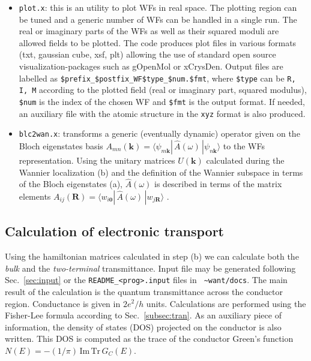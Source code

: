 \begin{itemize}
\item {\tt plot.x}: this is an utility to plot WFs in real space.
      The plotting region can be tuned and a generic number of WFs can be
      handled in a single run.
      The real or imaginary parts of the WFs as well as their squared moduli are
      allowed fields to be plotted.
      The code produces plot files in various formats (txt, gaussian cube, xsf, plt)
      allowing the use of standard open source visualization-packages
      such as gOpenMol or xCrysDen. Output files are labelled as
      {\tt \$prefix\_\$postfix\_WF\$type\_\$num.\$fmt}, where {\tt \$type} can be
      {\tt R, I, M} according to the plotted field (real or imaginary part, squared
      modulus), {\tt \$num} is the index of the chosen WF and {\tt \$fmt} is the
      output format. If needed, an auxiliary file with the atomic structure
      in the {\tt xyz} format is also produced.
\item {\tt blc2wan.x}: transforms a generic (eventually dynamic) operator
      given on the Bloch eigenstates basis $A_{mn}(\mathbf{k}) =
      \langle \psi_{m\mathbf{k}} |\, \widehat{A}(\omega) \,|
      \psi_{n\mathbf{k}} \rangle$ to the WFs representation.
      Using the unitary matrices $U(\mathbf{k})$ calculated during the Wannier localization
      (b) and the definition of the Wannier subspace in terms of the Bloch eigenstates
      (a), $\widehat{A}(\omega)$ is described in terms of the matrix elements
      $A_{ij}(\mathbf{R}) = \langle w_{i\mathbf{0}} |\, \widehat{A}(\omega) \,|
      w_{j\mathbf{R}} \rangle$ .
\end{itemize}


\subsection {Calculation of electronic transport}
\label{subsection:transport}

Using the hamiltonian matrices calculated in step (b) we can
calculate both the {\em bulk} and the {\em two-terminal}
transmittance. Input file may be generated following
Sec.~\ref{sec:input} or the {\tt README\_<prog>.input} files in {\tt
\~{}want/docs}. The main result of the calculation is the quantum
transmittance across the conductor region.
Conductance is given in $2e^2/h$ units.
Calculations are performed using the Fisher-Lee formula according
to Sec.~\ref{subsec:tran}. As an auxiliary piece of information,
the density of states (DOS) projected on the conductor is also
written. This DOS is computed as the
trace of the conductor Green's function $ N(E) = -(1/\pi)\,
\text{Im} \, \text{Tr}\, G_C(E)$.

